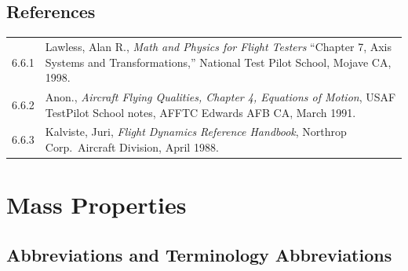 \documentclass[
]{book}
\begin{document}
\hypertarget{references-4}{%
\section{References}\label{references-4}}

\begin{longtable}[]{@{}ll@{}}
\toprule
\endhead
\begin{minipage}[t]{0.06\columnwidth}\raggedright
6.6.1\strut
\end{minipage} & \begin{minipage}[t]{0.88\columnwidth}\raggedright
Lawless, Alan R., \emph{Math and Physics for Flight Testers} ``Chapter 7, Axis Systems and Transformations,'' National Test Pilot School, Mojave CA, 1998.\strut
\end{minipage}\tabularnewline
\begin{minipage}[t]{0.06\columnwidth}\raggedright
6.6.2\strut
\end{minipage} & \begin{minipage}[t]{0.88\columnwidth}\raggedright
Anon., \emph{Aircraft Flying Qualities, Chapter 4, Equations of Motion}, USAF TestPilot School notes, AFFTC Edwards AFB CA, March 1991.\strut
\end{minipage}\tabularnewline
\begin{minipage}[t]{0.06\columnwidth}\raggedright
6.6.3\strut
\end{minipage} & \begin{minipage}[t]{0.88\columnwidth}\raggedright
Kalviste, Juri, \emph{Flight Dynamics Reference Handbook}, Northrop Corp.~Aircraft Division, April 1988.\strut
\end{minipage}\tabularnewline
\bottomrule
\end{longtable}

\hypertarget{mass-properties}{%
\chapter{Mass Properties}\label{mass-properties}}

\hypertarget{abbreviations-and-terminology-abbreviations}{%
\section{Abbreviations and Terminology Abbreviations}\label{abbreviations-and-terminology-abbreviations}}
\end{document}
